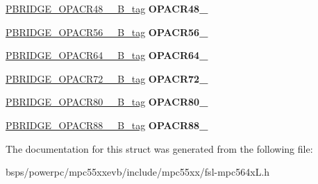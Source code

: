 \begin{DoxyCompactItemize}
\mbox{\hyperlink{unionPBRIDGE__OPACR48__55__32B__tag}{P\+B\+R\+I\+D\+G\+E\+\_\+\+O\+P\+A\+C\+R48\+\_\+\_\+B\+\_\+tag}} {\bfseries O\+P\+A\+C\+R48\+\_}
\item 
\mbox{\label{structPBRIDGE__struct__tag_ad081ea983c11e14eec8a5f6504227e67}} 
\mbox{\hyperlink{unionPBRIDGE__OPACR56__63__32B__tag}{P\+B\+R\+I\+D\+G\+E\+\_\+\+O\+P\+A\+C\+R56\+\_\+\_\+B\+\_\+tag}} {\bfseries O\+P\+A\+C\+R56\+\_}
\item 
\mbox{\label{structPBRIDGE__struct__tag_a2699aee24eac8de97dc1e21f99f4136f}} 
\mbox{\hyperlink{unionPBRIDGE__OPACR64__71__32B__tag}{P\+B\+R\+I\+D\+G\+E\+\_\+\+O\+P\+A\+C\+R64\+\_\+\_\+B\+\_\+tag}} {\bfseries O\+P\+A\+C\+R64\+\_}
\item 
\mbox{\label{structPBRIDGE__struct__tag_a9e3c9f339476cddfe5d53a38558503d2}} 
\mbox{\hyperlink{unionPBRIDGE__OPACR72__79__32B__tag}{P\+B\+R\+I\+D\+G\+E\+\_\+\+O\+P\+A\+C\+R72\+\_\+\_\+B\+\_\+tag}} {\bfseries O\+P\+A\+C\+R72\+\_}
\item 
\mbox{\label{structPBRIDGE__struct__tag_ab5f6173d110ecc9f27568e047ef58385}} 
\mbox{\hyperlink{unionPBRIDGE__OPACR80__87__32B__tag}{P\+B\+R\+I\+D\+G\+E\+\_\+\+O\+P\+A\+C\+R80\+\_\+\_\+B\+\_\+tag}} {\bfseries O\+P\+A\+C\+R80\+\_}
\item 
\mbox{\label{structPBRIDGE__struct__tag_a8e7f63a027ede2ddcb6cb4d2a17c544a}} 
\mbox{\hyperlink{unionPBRIDGE__OPACR88__95__32B__tag}{P\+B\+R\+I\+D\+G\+E\+\_\+\+O\+P\+A\+C\+R88\+\_\+\_\+B\+\_\+tag}} {\bfseries O\+P\+A\+C\+R88\+\_}
\end{DoxyCompactItemize}


The documentation for this struct was generated from the following file\+:\begin{DoxyCompactItemize}
\item 
bsps/powerpc/mpc55xxevb/include/mpc55xx/fsl-\/mpc564x\+L.\+h\end{DoxyCompactItemize}
